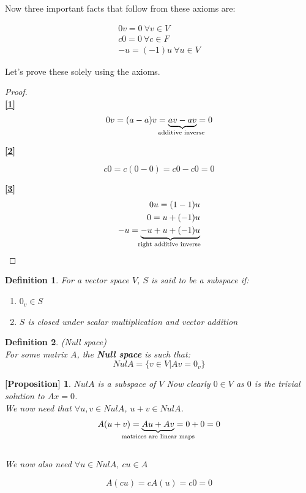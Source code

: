 \documentclass[titlepage]{article}
\newtheorem{prop}{[Proposition]}
\newtheorem{definition}{Definition}[subsection]
\numberwithin{equation}{subsection}
\begin{document}
Now three important facts that follow from these axioms are:

\begin{align}
    \label{1}0v = 0 \ \forall v \in V\\
    \label{2}c0 = 0 \ \forall c \in F\\
    \label{3}-u = (-1)u \ \forall u \in V
\end{align}

Let's prove these solely using the axioms. 
\begin{proof}
\\

\textbf{\ref{1}}
$$ 0v = (a-a)v = \underbrace{av - av}_{\text{\makebox[0pt]{additive inverse} }} = 0 $$

\textbf{\ref{2}}

$$ c0 = c(0-0) = c0 - c0 = 0$$

\textbf{\ref{3}}
\begin{align*}
    0u = (1-1)u\\
    0 = u + (-1)u\\
    -u = \underbrace{-u + u + (-1)u}_{\text{\makebox[0pt]{right additive inverse} }}
\end{align*}
\end{proof}


\begin{definition}
For a vector space $V$, $S$ is said to be a subspace if:

\begin{enumerate}
    \item $0_{v} \in S$
    \item $S$ is closed under scalar multiplication and vector addition
\end{enumerate}
\end{definition}

\begin{definition}(Null space)
\\
For some matrix $A$, the \textbf{Null space} is such that:
$$Nul A = \{v\in V| Av = 0_{v}\} $$
\end{definition}

\begin{prop}
$Nul A$ is a subspace of $V$
Now clearly $0 \in V$ as $0$ is the trivial solution to $Ax = 0$.
\\
We now need that $\forall u,v \in Nul A$, $u+v \in Nul A$.
$$A(u+v) = \underbrace{Au + Av}_{\text{\makebox[0pt]{matrices are linear maps}}} = 0 + 0 = 0$$
\\
We now also need $\forall u \in Nul A, \ cu \in A$

$$ A(cu) = cA(u) = c0 = 0$$
\end{prop}
\end{document}
